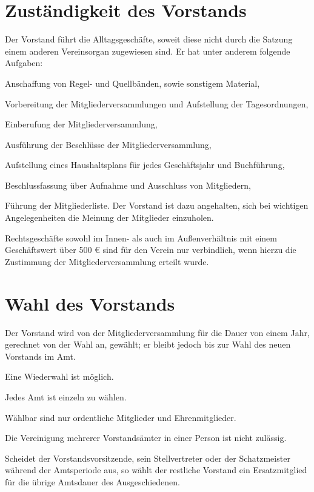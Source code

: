 \section{Zuständigkeit des Vorstands}
\begin{para}
	\item Der Vorstand führt die Alltagsgeschäfte, soweit diese nicht durch die Satzung einem anderen Vereinsorgan zugewiesen sind. Er hat unter anderem folgende Aufgaben:
	\begin{subpara}
		\item Anschaffung von Regel- und Quellbänden, sowie sonstigem Material,
		\item Vorbereitung der Mitgliederversammlungen und Aufstellung der Tagesordnungen,
		\item Einberufung der Mitgliederversammlung,
		\item Ausführung der Beschlüsse der Mitgliederversammlung,
		\item Aufstellung eines Haushaltsplans für jedes Geschäftsjahr und Buchführung,
		\item Beschlussfassung über Aufnahme und Ausschluss von Mitgliedern,
		\item Führung der Mitgliederliste.
		Der Vorstand ist dazu angehalten, sich bei wichtigen Angelegenheiten die Meinung der Mitglieder einzuholen.
	\end{subpara}
	\item Rechtsgeschäfte sowohl im Innen- als auch im Außenverhältnis mit einem Geschäftswert über 500 € sind für den Verein nur verbindlich, wenn hierzu die Zustimmung der Mitgliederversammlung erteilt wurde.
\end{para}

\section{Wahl des Vorstands}
\begin{para}
	\item Der Vorstand wird von der Mitgliederversammlung für die Dauer von einem Jahr, gerechnet von der Wahl an, gewählt; er bleibt jedoch bis zur Wahl des neuen Vorstands im Amt. 
	\item Eine Wiederwahl ist möglich.
	\item Jedes Amt ist einzeln zu wählen.
	\item Wählbar sind nur ordentliche Mitglieder und Ehrenmitglieder.
	\item Die Vereinigung mehrerer Vorstandsämter in einer Person ist nicht zulässig.
	\item Scheidet der Vorstandsvorsitzende, sein Stellvertreter oder der Schatzmeister während der Amtsperiode aus, so wählt der restliche Vorstand ein Ersatzmitglied für die übrige Amtsdauer des Ausgeschiedenen.
\end{para}

